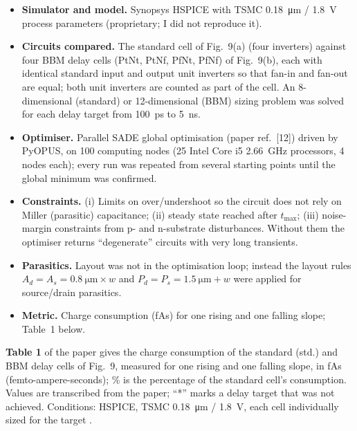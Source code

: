 \documentclass[11pt,a4paper]{article}
\begin{document}
\begin{itemize}
  \item \textbf{Simulator and model.} Synopsys HSPICE with TSMC \SI{0.18}{\micro\meter} / \SI{1.8}{\volt} process parameters (proprietary; I did not reproduce it).
  \item \textbf{Circuits compared.} The standard cell of Fig.~9(a) (four inverters) against four BBM delay cells (PtNt, PtNf, PfNt, PfNf) of Fig.~9(b), each with identical standard input and output unit inverters so that fan-in and fan-out are equal; both unit inverters are counted as part of the cell. An 8-dimensional (standard) or 12-dimensional (BBM) sizing problem was solved for each delay target from \SI{100}{\pico\second} to \SI{5}{\nano\second}.
  \item \textbf{Optimiser.} Parallel SADE global optimisation (paper ref.~[12]) driven by PyOPUS, on 100 computing nodes (25 Intel Core i5 \SI{2.66}{\giga\hertz} processors, 4 nodes each); every run was repeated from several starting points until the global minimum was confirmed.
  \item \textbf{Constraints.} (i) Limits on over/undershoot so the circuit does not rely on Miller (parasitic) capacitance; (ii) steady state reached after $t_{\max}$; (iii) noise-margin constraints from p- and n-substrate disturbances. Without them the optimiser returns ``degenerate'' circuits with very long transients.
  \item \textbf{Parasitics.} Layout was not in the optimisation loop; instead the layout rules $A_d=A_s=\SI{0.8}{\micro\meter}\times w$ and $P_d=P_s=\SI{1.5}{\micro\meter}+w$ were applied for source/drain parasitics.
  \item \textbf{Metric.} Charge consumption (fAs) for one rising and one falling slope; Table~1 below.
\end{itemize}

\textbf{Table 1} of the paper gives the charge consumption of the standard (std.) and BBM delay cells of Fig.~9, measured for one rising and one falling slope, in fAs (femto-ampere-seconds); \% is the percentage of the standard cell's consumption. Values are transcribed from the paper; ``*'' marks a delay target that was not achieved. Conditions: HSPICE, TSMC \SI{0.18}{\micro\meter} / \SI{1.8}{\volt}, each cell individually sized for the target \Tp{}.
\end{document}
